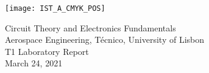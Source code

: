 
\thispagestyle {empty}

\texttt{[image: IST\_A\_CMYK\_POS]}

\begin{center}
%

\vspace{1.0cm}


\vspace{1cm}
{\FontLb Circuit Theory and Electronics Fundamentals} \\ %
\vspace{1cm}
{\FontSn Aerospace Engineering, Técnico, University of Lisbon} \\ %
\vspace{1cm}
{\FontSn T1 Laboratory Report} \\
\vspace{1cm}
{\FontSn March 24, 2021} \\ %
\vspace{1cm}
\author[1]{Duarte Brito, 96373}
\author[2]{Henrique Caraça, 96393}
\author[3]{Nuno Ribeiro, 96459}
\end{center}

